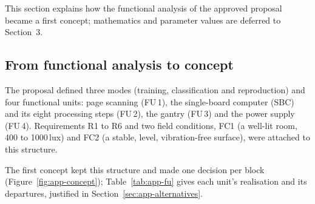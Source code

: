 \label{sec:approach}
This section explains how the functional analysis of the approved proposal became a first concept; mathematics and parameter values are deferred to Section~3.

\subsection{From functional analysis to concept}
\label{sec:app-concept}

The proposal defined three modes (training, classification and reproduction) and four functional units: page scanning (FU\,1), the single-board computer (SBC) and its eight processing steps (FU\,2), the gantry (FU\,3) and the power supply (FU\,4). Requirements R1 to R6 and two field conditions, FC1 (a well-lit room, 400 to 1000\,lux) and FC2 (a stable, level, vibration-free surface), were attached to this structure.

The first concept kept this structure and made one decision per block (Figure~\ref{fig:app-concept}); Table~\ref{tab:app-fu} gives each unit's realisation and its departures, justified in Section~\ref{sec:app-alternatives}.

